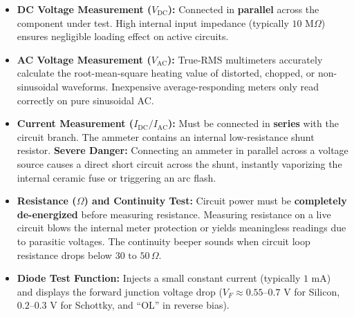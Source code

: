 \begin{keyconcept}
\begin{itemize}[leftmargin=*]
    \item \textbf{DC Voltage Measurement ($V_{\text{DC}}$):} Connected in \textbf{parallel} across the component under test. High internal input impedance (typically $10\text{ M}\Omega$) ensures negligible loading effect on active circuits.
    \item \textbf{AC Voltage Measurement ($V_{\text{AC}}$):} True-RMS multimeters accurately calculate the root-mean-square heating value of distorted, chopped, or non-sinusoidal waveforms. Inexpensive average-responding meters only read correctly on pure sinusoidal AC.
    \item \textbf{Current Measurement ($I_{\text{DC}} / I_{\text{AC}}$):} Must be connected in \textbf{series} with the circuit branch. The ammeter contains an internal low-resistance shunt resistor. \textbf{Severe Danger:} Connecting an ammeter in parallel across a voltage source causes a direct short circuit across the shunt, instantly vaporizing the internal ceramic fuse or triggering an arc flash.
    \item \textbf{Resistance ($\Omega$) and Continuity Test:} Circuit power must be \textbf{completely de-energized} before measuring resistance. Measuring resistance on a live circuit blows the internal meter protection or yields meaningless readings due to parasitic voltages. The continuity beeper sounds when circuit loop resistance drops below $30\text{ to }50\,\Omega$.
    \item \textbf{Diode Test Function:} Injects a small constant current (typically $1\text{ mA}$) and displays the forward junction voltage drop ($V_F \approx 0.55\text{--}0.7\text{ V}$ for Silicon, $0.2\text{--}0.3\text{ V}$ for Schottky, and ``OL'' in reverse bias).
\end{itemize}
\end{keyconcept}

